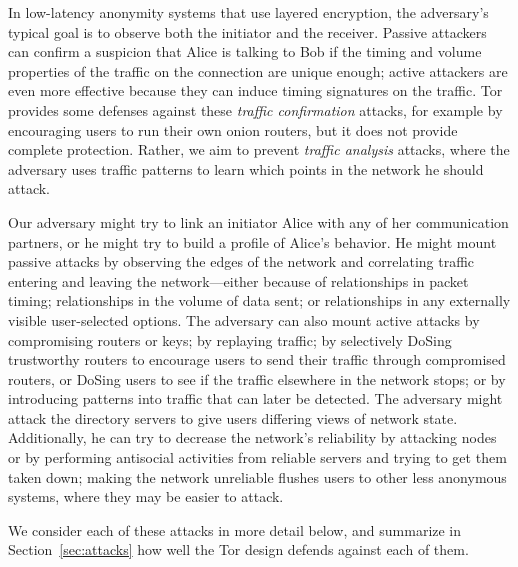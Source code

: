 \documentclass[times,10pt,twocolumn]{article}
\begin{document}
In low-latency anonymity systems that use layered encryption, the
adversary's typical goal is to observe both the initiator and the
receiver. Passive attackers can confirm a suspicion that Alice is
talking to Bob if the timing and volume properties of the traffic on the
connection are unique enough; active attackers are even more effective
because they can induce timing signatures on the traffic. Tor provides
some defenses against these \emph{traffic confirmation} attacks, for
example by encouraging users to run their own onion routers, but it does
not provide complete protection. Rather, we aim to prevent \emph{traffic
analysis} attacks, where the adversary uses traffic patterns to learn
which points in the network he should attack.

Our adversary might try to link an initiator Alice with any of her
communication partners, or he might try to build a profile of Alice's
behavior. He might mount passive attacks by observing the edges of the
network and correlating traffic entering and leaving the network---either
because of relationships in packet timing; relationships in the volume
of data sent; or relationships in any externally visible user-selected
options. The adversary can also mount active attacks by compromising
routers or keys; by replaying traffic; by selectively DoSing trustworthy
routers to encourage users to send their traffic through compromised
routers, or DoSing users to see if the traffic elsewhere in the
network stops; or by introducing patterns into traffic that can later be
detected. The adversary might attack the directory servers to give users
differing views of network state. Additionally, he can try to decrease
the network's reliability by attacking nodes or by performing antisocial
activities from reliable servers and trying to get them taken down;
making the network unreliable flushes users to other less anonymous
systems, where they may be easier to attack.

We consider each of these attacks in more detail below, and summarize
in Section~\ref{sec:attacks} how well the Tor design defends against
each of them.


\label{sec:design}
\end{document}
